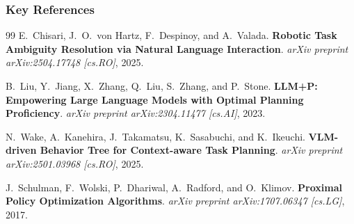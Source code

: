 \documentclass[10pt]{beamer}
\begin{document}
\begin{frame}[t]
    \frametitle{Key References}
    \footnotesize
    \begin{thebibliography}{99}
        E.~Chisari, J.~O.~von Hartz, F.~Despinoy, and A.~Valada.
        \newblock \textbf{Robotic Task Ambiguity Resolution via Natural Language Interaction}.
        \newblock \textit{arXiv preprint arXiv:2504.17748 [cs.RO]}, 2025.

        \vspace{0.15cm}
        B.~Liu, Y.~Jiang, X.~Zhang, Q.~Liu, S.~Zhang, and P.~Stone.
        \newblock \textbf{LLM+P: Empowering Large Language Models with Optimal Planning Proficiency}.
        \newblock \textit{arXiv preprint arXiv:2304.11477 [cs.AI]}, 2023.

        \vspace{0.15cm}
        N.~Wake, A.~Kanehira, J.~Takamatsu, K.~Sasabuchi, and K.~Ikeuchi.
        \newblock \textbf{VLM-driven Behavior Tree for Context-aware Task Planning}.
        \newblock \textit{arXiv preprint arXiv:2501.03968 [cs.RO]}, 2025.

        \vspace{0.15cm}
        J.~Schulman, F.~Wolski, P.~Dhariwal, A.~Radford, and O.~Klimov.
        \newblock \textbf{Proximal Policy Optimization Algorithms}.
        \newblock \textit{arXiv preprint arXiv:1707.06347 [cs.LG]}, 2017.
    \end{thebibliography}
\end{frame}
\end{document}
